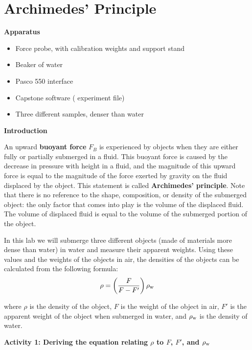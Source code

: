 \section{Archimedes' Principle}

\makelabheader %


\bigskip
\textbf{Apparatus}

\begin{itemize}[nosep]
\item Force probe, with calibration weights and support stand
\item Beaker of water
\item Pasco 550 interface
\item Capstone software ( experiment file)
\item Three different samples, denser than water
\end{itemize}

\bigskip
\textbf{Introduction}

An upward \textbf{buoyant force} $F_B$ is experienced by objects when they are either fully or partially submerged in a fluid. This buoyant force is caused by the decrease in pressure with height in a fluid, and the magnitude of this upward force is equal to the magnitude of the force exerted by gravity on the fluid displaced by the object. 
This statement is called \textbf{Archimedes' principle}. Note that there is no reference to the shape, composition, or density of the submerged object: the only factor that comes into play is the volume of the displaced fluid. 
The volume of displaced fluid is equal to the volume of the submerged portion of the object.

In this lab we will submerge three different objects (made of materials more dense than water) in water and measure their apparent weights. Using these values and the weights of the objects in air, the densities of the objects can be calculated from the following formula:
\begin{equation}
\rho = \left( \frac{F}{F-F'}\right)\rho_{\rm w}
\label{equation_archimedes_density}
\end{equation}

where $\rho$ is the density of the object, $F$ is the weight of the object in air, $F'$ is the apparent weight of the object when submerged in water, and $\rho_{\rm w}$ is the density of water.

\bigskip
\textbf{Activity 1: Deriving the equation relating $\rho$ to $F$, $F'$, and $\rho_{\rm w}$}

